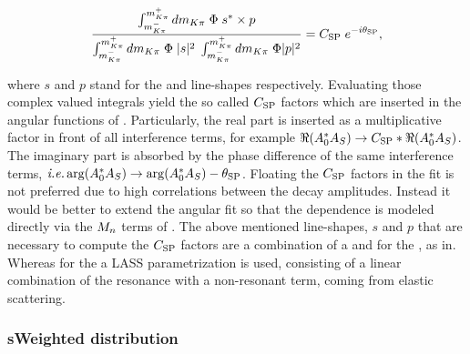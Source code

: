 \begin{equation}
  \centering
  \label{csp_def}
  \frac{\int_{\mkpi^-}^{\mkpi^+} d\mkpi \; \Phi \; s^* \times p} {\int_{\mkpi^-}^{\mkpi^+} d\mkpi \; \Phi \; |s|^2 \; \int_{\mkpi^-}^{\mkpi^+} d\mkpi \; \Phi |p|^2} = \CSP \; e^{-i\ThetaSP},
\end{equation}

\noindent where $s$ and $p$ stand for the \swave and \pwave line-shapes respectively. Evaluating those complex valued integrals yield
the so called $C_{\text{SP}}$ factors which are inserted in the angular functions of . Particularly, the real part
is inserted as a multiplicative factor in front of all \spwave interference terms, for example $\Re({A}_{0}^* {A}_{S}) \rightarrow C_{\text{SP}} * \Re({A}_{0}^* {A}_{S})$.
The imaginary part is absorbed by the phase difference of the same interference
terms, $\mbox{\itshape i.e.} \arg(A_0^*A_S) \rightarrow \arg(A_0^*A_S) - \theta_{\text{SP}}$. Floating the $C_{\text{SP}}$ factors in the fit is not preferred due
to high correlations between the decay amplitudes. Instead it would be better to extend the angular fit so that the \mkpi dependence
is modeled directly via the $M_{n}$ terms of . The above mentioned line-shapes, $s$ and $p$ that are necessary
to compute the $C_{\text{SP}}$ factors are a combination of a \KstENT and \KstOFOZ for the \pwave, as in\cite{PhysRevD.11.3165}.
Whereas for the \swave a LASS parametrization\cite{Aston1988493} is used, consisting of a linear combination of the \KstOFTZ resonance with
a non-resonant term, coming from elastic scattering.

\subsubsection{sWeighted \mkpi distribution}

